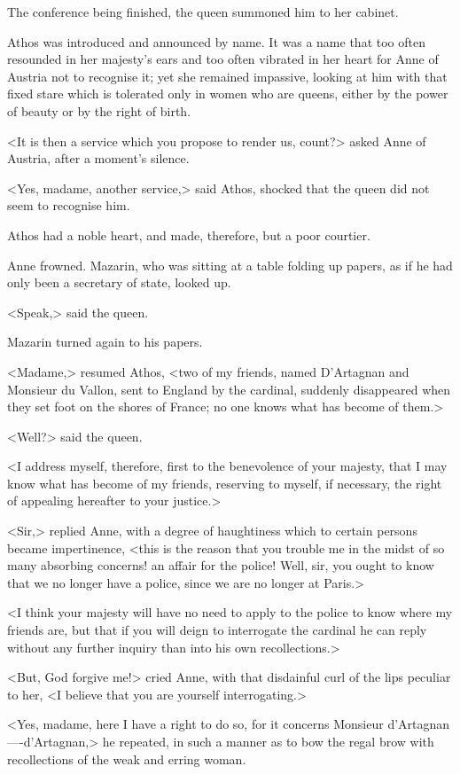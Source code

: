 The conference being finished, the queen summoned him to her cabinet.

Athos was introduced and announced by name. It was a name that too often resounded in her majesty's ears and too often vibrated in her heart for Anne of Austria not to recognise it; yet she remained impassive, looking at him with that fixed stare which is tolerated only in women who are queens, either by the power of beauty or by the right of birth.

<It is then a service which you propose to render us, count?> asked Anne of Austria, after a moment's silence.

<Yes, madame, another service,> said Athos, shocked that the queen did not seem to recognise him.

Athos had a noble heart, and made, therefore, but a poor courtier.

Anne frowned. Mazarin, who was sitting at a table folding up papers, as if he had only been a secretary of state, looked up.

<Speak,> said the queen.

Mazarin turned again to his papers.

<Madame,> resumed Athos, <two of my friends, named D'Artagnan and Monsieur du Vallon, sent to England by the cardinal, suddenly disappeared when they set foot on the shores of France; no one knows what has become of them.>

<Well?> said the queen.

<I address myself, therefore, first to the benevolence of your majesty, that I may know what has become of my friends, reserving to myself, if necessary, the right of appealing hereafter to your justice.>

<Sir,> replied Anne, with a degree of haughtiness which to certain persons became impertinence, <this is the reason that you trouble me in the midst of so many absorbing concerns! an affair for the police! Well, sir, you ought to know that we no longer have a police, since we are no longer at Paris.>

<I think your majesty will have no need to apply to the police to know where my friends are, but that if you will deign to interrogate the cardinal he can reply without any further inquiry than into his own recollections.>

<But, God forgive me!> cried Anne, with that disdainful curl of the lips peculiar to her, <I believe that you are yourself interrogating.>

<Yes, madame, here I have a right to do so, for it concerns Monsieur d'Artagnan—-d'Artagnan,> he repeated, in such a manner as to bow the regal brow with recollections of the weak and erring woman.


